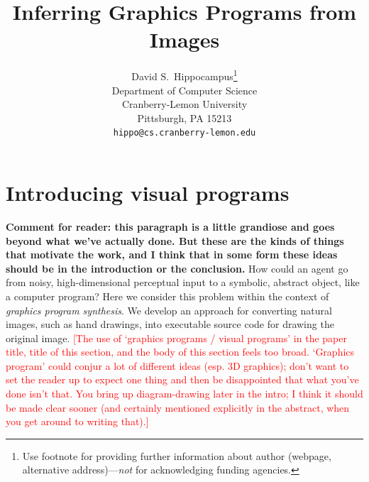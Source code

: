 \documentclass{article}
\title{Inferring Graphics Programs from Images}
\author{
  David S.~Hippocampus\thanks{Use footnote for providing further
    information about author (webpage, alternative
    address)---\emph{not} for acknowledging funding agencies.} \\
  Department of Computer Science\\
  Cranberry-Lemon University\\
  Pittsburgh, PA 15213 \\
  \texttt{hippo@cs.cranberry-lemon.edu} \\
}
\newcommand{\remark}[1]{\textcolor{red}{[#1]}}
\begin{document}

\maketitle

\begin{abstract}
\end{abstract}

\section{Introducing visual programs}

\textbf{Comment for reader: this paragraph is a little grandiose and goes
  beyond what we've actually done. But these are the kinds of things
  that motivate the work, and I think that in some form these ideas
  should be in the introduction or the conclusion.} How could an agent go from noisy,
high-dimensional perceptual input to a symbolic, abstract object, like
a computer program?  Here we consider this problem within the context
of \emph{graphics program synthesis}.  We develop an approach for
converting natural images, such as hand drawings, into executable
source code for drawing the original image.
\remark{The use of `graphics programs / visual programs' in the paper title, title of this section, and the body of this section feels too broad. `Graphics program' could conjur a lot of different ideas (esp. 3D graphics); don't want to set the reader up to expect one thing and then be disappointed that what you've done isn't that. You bring up diagram-drawing later in the intro; I think it should be made clear sooner (and certainly mentioned explicitly in the abstract, when you get around to writing that).}
\end{document}
